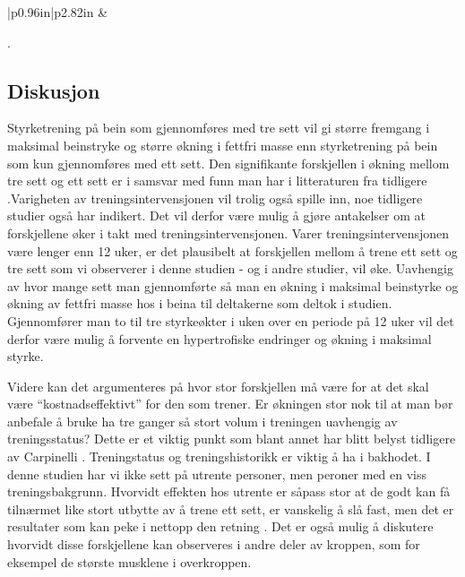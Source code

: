 \documentclass[
]{book}
\begin{document}
\begin{longtable}[c]{|p{0.96in}|p{2.82in}}
 &  \\

\noalign{\global\setlength{\arrayrulewidth}{2pt}}



\end{longtable}

.

\hypertarget{diskusjon-1}{%
\subsection{Diskusjon}\label{diskusjon-1}}

Styrketrening på bein som gjennomføres med tre sett vil gi større fremgang i maksimal beinstryke og større økning i fettfri masse enn styrketrening på bein som kun gjennomføres med ett sett. Den signifikante forskjellen i økning mellom tre sett og ett sett er i samsvar med funn man har i litteraturen fra tidligere \citep{rhea2002, munn2005, fröhlich2010}.Varigheten av treningsintervensjonen vil trolig også spille inn, noe tidligere studier også har indikert\citep{rhea2002}. Det vil derfor være mulig å gjøre antakelser om at forskjellene øker i takt med treningsintervensjonen. Varer treningsintervensjonen være lenger enn 12 uker, er det plausibelt at forskjellen mellom å trene ett sett og tre sett som vi observerer i denne studien - og i andre studier, vil øke. Uavhengig av hvor mange sett man gjennomførte så man en økning i maksimal beinstyrke og økning av fettfri masse hos i beina til deltakerne som deltok i studien. Gjennomfører man to til tre styrkeøkter i uken over en periode på 12 uker vil det derfor være mulig å forvente en hypertrofiske endringer og økning i maksimal styrke.

Videre kan det argumenteres på hvor stor forskjellen må være for at det skal være ``kostnadseffektivt'' for den som trener. Er økningen stor nok til at man bør anbefale å bruke ha tre ganger så stort volum i treningen uavhengig av treningsstatus? Dette er et viktig punkt som blant annet har blitt belyst tidligere av Carpinelli \citep{carpinelli1998}. Treningstatus og treningshistorikk er viktig å ha i bakhodet. I denne studien har vi ikke sett på utrente personer, men peroner med en viss treningsbakgrunn. Hvorvidt effekten hos utrente er såpass stor at de godt kan få tilnærmet like stort utbytte av å trene ett sett, er vanskelig å slå fast, men det er resultater som kan peke i nettopp den retning \citep{radaelli2014}. Det er også mulig å diskutere hvorvidt disse forskjellene kan observeres i andre deler av kroppen, som for eksempel de største musklene i overkroppen\citep{hass2000}.
\end{document}
